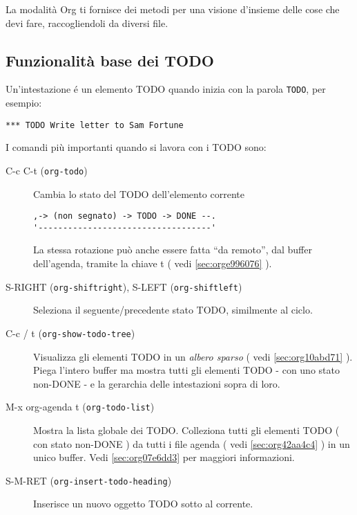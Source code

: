 \documentclass[11pt]{article}
\begin{document}
La modalità Org ti fornisce dei metodi per una visione d'insieme
delle cose che devi fare, raccogliendoli da diversi file.

\subsection[TODO Basics]{Funzionalità base dei TODO}
\label{sec:orgcfb6ead}
Un'intestazione é un elemento TODO quando inizia con la parola \texttt{TODO},
per esempio:

\begin{verbatim}
*** TODO Write letter to Sam Fortune
\end{verbatim}


I comandi più importanti quando si lavora con i TODO sono:

\begin{description}
\item[{C-c C-t (\texttt{org-todo})}] Cambia lo stato del TODO dell'elemento corrente

\begin{verbatim}
,-> (non segnato) -> TODO -> DONE --.
'-----------------------------------'
\end{verbatim}


La stessa rotazione può anche essere fatta ``da remoto'', dal buffer
dell'agenda, tramite la chiave t ( vedi \ref{sec:orge996076} ).

\item[{S-RIGHT (\texttt{org-shiftright}), S-LEFT (\texttt{org-shiftleft})}] Seleziona il seguente/precedente stato TODO, similmente al ciclo.

\item[{C-c / t (\texttt{org-show-todo-tree})}] Visualizza gli elementi TODO in un \emph{albero sparso} ( vedi \ref{sec:org10abd71} ). Piega l'intero buffer ma mostra tutti gli elementi
TODO - con uno stato non-DONE - e la gerarchia delle intestazioni
sopra di loro.

\item[{M-x org-agenda t (\texttt{org-todo-list})}] Mostra la lista globale dei TODO. Colleziona tutti gli elementi TODO
( con stato non-DONE ) da tutti i file agenda ( vedi
\ref{sec:org42aa4c4} ) in un unico buffer. Vedi \ref{sec:org07e6dd3} per maggiori informazioni.

\item[{S-M-RET (\texttt{org-insert-todo-heading})}] Inserisce un nuovo oggetto TODO sotto al corrente.
\end{description}
\end{document}
